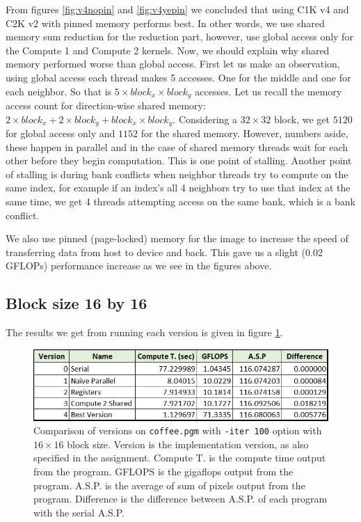 \documentclass[12pt,reqno]{amsart}
\newcommand{\code}[1]{\texttt{#1}}
\begin{document}
From figures \ref{fig:v4nopin} and \ref{fig:v4yepin} we concluded that using C1K v4 and C2K v2 with pinned memory performs best. In other words, we use shared memory sum reduction for the reduction part, however, use global access only for the Compute 1 and Compute 2 kernels. 
Now, we should explain why shared memory performed worse than global access. First let us make an observation, using global access each thread makes 5 accesses. One for the middle and one for each neighbor. So that is $5 \times block_x \times block_y$ accesses. Let us recall the memory access count for direction-wise shared memory: $2 \times block_x + 2 \times block_y + block_x \times block_y$. Considering a $32\times32$ block, we get $5120$ for global access only and $1152$ for the shared memory. However, numbers aside, these happen in parallel and in the case of shared memory threads wait for each other before they begin computation. This is one point of stalling. 
Another point of stalling is during bank conflicts when neighbor threads try to compute on the same index, for example if an index's all 4 neighbors try to use that index at the same time, we get 4 threads attempting access on the same bank, which is a bank conflict.

We also use pinned (page-locked) memory for the image to increase the speed of transferring data from host to device and back. This gave us a slight (0.02 GFLOPs) performance increase as we see in the figures above.

\subsection{Block size 16 by 16}
The results we get from running each version is given in figure \ref{fig:rescomp16}.
\begin{figure}[h]
\centering
\includegraphics[width=0.9\linewidth]{allresults16.png}
\caption{Comparison of versions on \code{coffee.pgm} with \code{-iter 100} option with $16\times16$ block size. Version is the implementation version, as also specified in the assignment. Compute T. is the compute time output from the program. GFLOPS is the gigaflops output from the program. A.S.P. is the average of sum of pixels output from the program. Difference is the difference between A.S.P. of each program with the serial A.S.P.}
\label{fig:rescomp16}
\end{figure}
\end{document}

